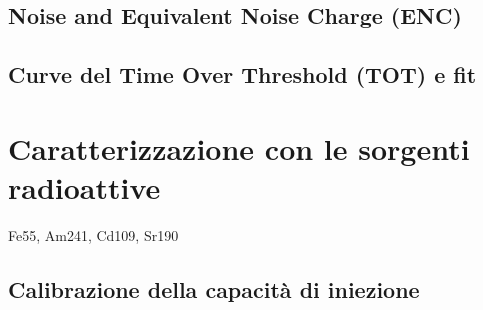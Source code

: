 \subsection{Noise and Equivalent Noise Charge (ENC)}

\subsection{Curve del Time Over Threshold (TOT) e fit}

\section{Caratterizzazione con le sorgenti radioattive}

Fe55, Am241, Cd109, Sr190

\subsection{Calibrazione della capacità di iniezione}
